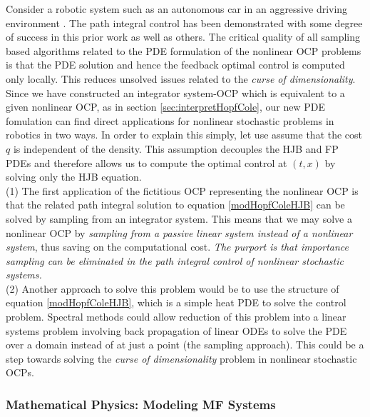 \documentclass[letterpaper, 12pt]{article}
\begin{document}
Consider a robotic system such as an autonomous car in an aggressive driving environment \cite{Grady2017}. The path integral control has been demonstrated with some degree of success in this prior work as well as others. The critical quality of all sampling based algorithms related to the PDE formulation of the nonlinear OCP problems is that the PDE solution and hence the feedback optimal control is computed only locally. This reduces unsolved issues related to the \textit{curse of dimensionality}. \\
\indent Since we have constructed an integrator system-OCP which is equivalent to a given nonlinear OCP, as in section \ref{sec:interpretHopfCole}, our new PDE fomulation can find direct applications for nonlinear stochastic problems in robotics in two ways. In order to explain this simply, let use assume that the cost $q$ is independent of the density. This assumption decouples the HJB and FP PDEs and therefore allows us to compute the optimal control at $(t,x)$ by solving only the HJB equation. \\
(1) The first application of the fictitious OCP representing the nonlinear OCP is that the related path integral solution to equation \eqref{modHopfColeHJB} can be solved by sampling from an integrator system. This means that we may solve a nonlinear OCP by \textit{sampling from a passive linear system instead of a nonlinear system}, thus saving on the computational cost. \textit{The purport is that importance sampling can be eliminated in the path integral control of nonlinear stochastic systems.} \\
(2) Another approach to solve this problem would be to use the structure of equation \eqref{modHopfColeHJB}, which is a simple heat PDE to solve the control problem. Spectral methods could allow reduction of this problem into a linear systems problem involving back propagation of linear ODEs to solve the PDE over a domain instead of at just a point (the sampling approach). This could be a step towards solving the \textit{curse of dimensionality} problem in nonlinear stochastic OCPs.

\subsubsection{Mathematical Physics: Modeling MF Systems}
\end{document}
